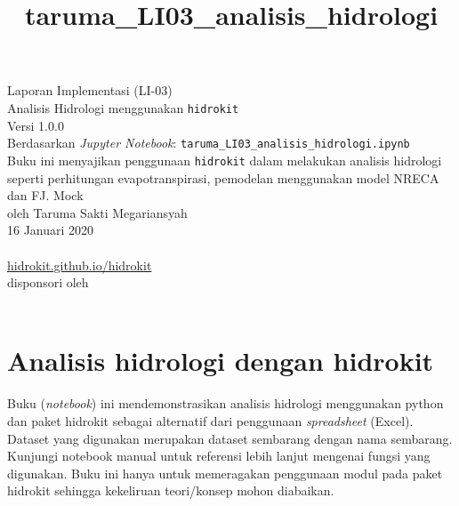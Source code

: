 \documentclass[11pt]{article}
\title{taruma\_LI03\_analisis\_hidrologi}
\begin{document}
    

	\begin{titlepage}
		\vspace*{\fill}
		\begin{center}
 		\normalsize Laporan Implementasi (LI-03)\\
		\huge Analisis Hidrologi menggunakan \texttt{hidrokit} \\ 
		\normalsize Versi 1.0.0 \\[0.2cm]
      	\small Berdasarkan \emph{Jupyter Notebook}: \texttt{taruma\_LI03\_analisis\_hidrologi.ipynb} \\[0.5cm]
      	\normalsize Buku ini menyajikan penggunaan \texttt{hidrokit} dalam melakukan analisis hidrologi seperti perhitungan evapotranspirasi, pemodelan menggunakan model NRECA dan FJ. Mock \\[0.5cm]
		\normalsize oleh Taruma Sakti Megariansyah\\[0.5cm]
      	\normalsize 16 Januari 2020\\[1cm]
    	\\
      	\normalsize \href{https://hidrokit.github.io/hidrokit}{hidrokit.github.io/hidrokit}  \\[0.5cm]
      	\small disponsori oleh \\[0.2cm]
    	\href{https://www.fiako.co.id}{}\\
		\end{center}
    	\vspace*{\fill}
	\end{titlepage}
    
    

    
    \hypertarget{analisis-hidrologi-dengan-hidrokit}{%
\section{Analisis hidrologi dengan
hidrokit}\label{analisis-hidrologi-dengan-hidrokit}}

Buku (\emph{notebook}) ini mendemonstrasikan analisis hidrologi
menggunakan python dan paket hidrokit sebagai alternatif dari penggunaan
\emph{spreadsheet} (Excel). Dataset yang digunakan merupakan dataset
sembarang dengan nama sembarang. Kunjungi notebook manual untuk
referensi lebih lanjut mengenai fungsi yang digunakan. Buku ini hanya
untuk memeragakan penggunaan modul pada paket hidrokit sehingga
kekeliruan teori/konsep mohon diabaikan.
\end{document}
